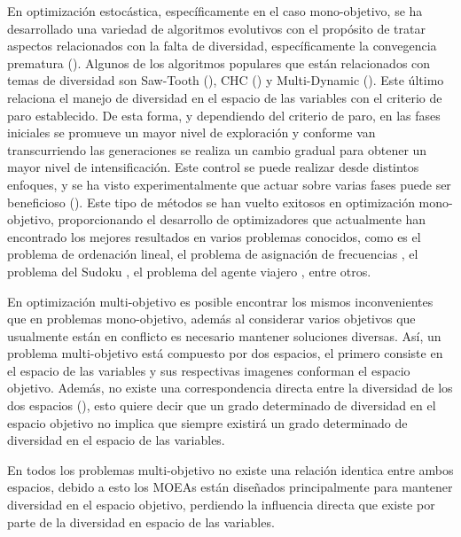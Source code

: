 En optimización estocástica, específicamente en el caso mono-objetivo, se ha desarrollado una variedad de algoritmos evolutivos con el propósito de tratar aspectos relacionados con la falta de diversidad, específicamente la convegencia prematura (\cite{Joel:Crepinsek}).
%
Algunos de los algoritmos populares que están relacionados con temas de diversidad son Saw-Tooth (\cite{Joel:SAWTOOTH}), CHC (\cite{Joel:CHC}) y Multi-Dynamic (\cite{Joel:MULTI_DYNAMIC}).
%
Este último relaciona el manejo de diversidad en el espacio de las variables con el criterio de paro establecido. %
%
De esta forma, y dependiendo del criterio de paro, en las fases iniciales se promueve un mayor nivel de exploración y conforme van transcurriendo las generaciones se realiza un cambio gradual para obtener un mayor nivel de intensificación.
%
Este control se puede realizar desde distintos enfoques, y se ha visto experimentalmente que actuar sobre varias fases puede ser beneficioso (\cite{Joel:ANovelDiversityBasedEAForTheTSP}).
%
Este tipo de métodos se han vuelto exitosos en optimización mono-objetivo, proporcionando el desarrollo de optimizadores que actualmente han encontrado los mejores resultados en varios problemas conocidos, como es el problema de ordenación lineal, el problema de asignación de frecuencias , el problema del Sudoku , el problema del agente viajero , entre otros.
%


En optimización multi-objetivo es posible encontrar los mismos inconvenientes que en problemas mono-objetivo, además al considerar varios objetivos que usualmente están en conflicto es necesario mantener soluciones diversas.
%
Así, un problema multi-objetivo está compuesto por dos espacios, el primero consiste en el espacio de las variables y sus respectivas imagenes conforman el espacio objetivo.
%
Además, no existe una correspondencia directa entre la diversidad de los dos espacios (\cite{shir2009enhancing}), esto quiere decir que un grado determinado de diversidad en el espacio objetivo no implica que siempre existirá un grado determinado de diversidad en el espacio de las variables.

% 
En todos los problemas multi-objetivo no existe una relación identica entre ambos espacios, debido a esto los MOEAs están diseñados principalmente para mantener diversidad en el espacio objetivo, perdiendo la influencia directa que existe por parte de la diversidad en espacio de las variables.

